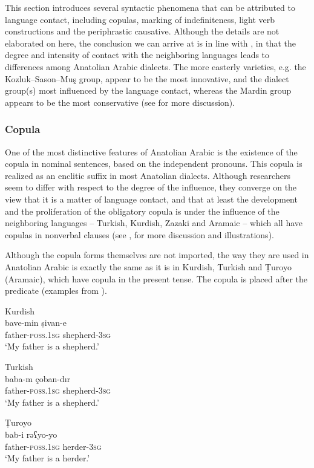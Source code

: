 \documentclass[output=paper]{langsci/langscibook}
\begin{document}
This section introduces several syntactic phenomena that can be attributed to language contact, including copulas, marking of indefiniteness, light verb constructions and the periphrastic causative. Although the details are not elaborated on here, the conclusion we can arrive at is in line with \cite{Ingham2005}, in that the degree and intensity of contact with the neighboring languages leads to differences among Anatolian Arabic dialects. The more easterly varieties, e.g. the Kozluk--Sason--Mu\c{s} group, appear to be the most innovative, and the dialect group(s) most influenced by the language contact, whereas the Mardin group appears to be the most conservative (see \citealt{Akkus2017,Jastrow2011anatolian} for more discussion).

\subsubsection{Copula}
One of the most distinctive features of Anatolian Arabic is the existence of the copula in nominal sentences, based on the independent pronouns. This copula is realized as an enclitic suffix in most Anatolian dialects. Although researchers seem to differ with respect to the degree of the influence, they converge on the view that it is a matter of language contact, and that at least the development and the proliferation of the obligatory copula is under the influence of the neighboring languages -- Turkish, Kurdish, Zazaki and Aramaic -- which all have copulas in nonverbal clauses (see \citealt{Lahdo2009,Grigore2007article,Palva2011,Talay2007,Jastrow2011anatolian,Akkus2016,Akkus2017,AkkusBenmamoun2018}, for more discussion and illustrations). 

Although the copula forms themselves are not imported, the way they are used in Anatolian Arabic is exactly the same as it is in Kurdish, Turkish and Ṭuroyo (Aramaic), which have copula in the present tense. The copula is placed after the predicate (examples from \citealt{Grigore2007article}).  

\begin{exe}
\ex \label{cop} 
		\begin{xlist}
		\ex Kurdish \\\label{copkrm}\gll bave-min ṣivan-e		\\
    father-\textsc{poss.1sg}		shepherd-\textsc{3sg} \\
       \glt `My father is a shepherd.'

	\ex Turkish \\
	\label{coptk} \gll baba-m 		çoban-dır\\
	father-\textsc{poss.1sg}		shepherd-\textsc{3sg}\\
        \glt  `My father is a shepherd.'
	
		\ex Ṭuroyo\\ \label{copara} \gll  bab-i		rəʕyo-yo\\
		father-\textsc{poss.1sg}		herder-\textsc{3sg}\\
      \glt  `My father is a herder.'
        \end{xlist}
      
\end{exe}
\end{document}

